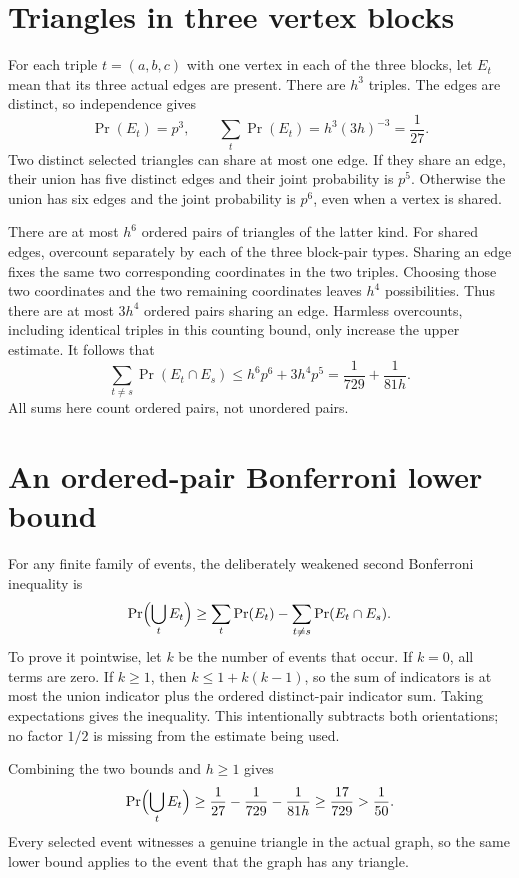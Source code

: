 \documentclass[11pt]{article}
\begin{document}
\newpage
\section*{Triangles in three vertex blocks}
For each triple $t=(a,b,c)$ with one vertex in each
of the three blocks, let $E_t$ mean that its three
actual edges are present. There are $h^3$ triples.
The edges are distinct, so independence gives
\[
               \Pr(E_t)=p^3,
           \qquad \sum_t\Pr(E_t)=h^3(3h)^{-3}=\frac1{27}.
\]
Two distinct selected triangles can share at most
one edge. If they share an edge, their union has
five distinct edges and their joint probability is
$p^5$. Otherwise the union has six edges and the
joint probability is $p^6$, even when a vertex is shared.

There are at most $h^6$ ordered pairs of triangles
of the latter kind. For shared edges, overcount
separately by each of the three block-pair types.
Sharing an edge fixes the same two corresponding
coordinates in the two triples. Choosing those two
coordinates and the two remaining coordinates
leaves $h^4$ possibilities. Thus there are at most
$3h^4$ ordered pairs sharing an edge. Harmless
overcounts, including identical triples in this
counting bound, only increase the upper estimate.
It follows that
\[
 \sum_{t\ne s}\Pr(E_t\cap E_s)
       \leq h^6p^6+3h^4p^5
       =\frac1{729}+\frac1{81h}.
\]
All sums here count ordered pairs, not unordered pairs.

\section*{An ordered-pair Bonferroni lower bound}
For any finite family of events, the deliberately
weakened second Bonferroni inequality is
\[
 \Pr\Bigl(\bigcup_t E_t\Bigr)
     \geq\sum_t\Pr(E_t)
                  -\sum_{t\ne s}\Pr(E_t\cap E_s).
\]
To prove it pointwise, let $k$ be the number of events
that occur. If $k=0$, all terms are zero. If $k\geq1$,
then $k\leq1+k(k-1)$, so the sum of indicators is at
most the union indicator plus the ordered distinct-pair
indicator sum. Taking expectations gives the inequality.
This intentionally subtracts both orientations; no
factor $1/2$ is missing from the estimate being used.

Combining the two bounds and $h\geq1$ gives
\[
 \Pr\Bigl(\bigcup_t E_t\Bigr)
   \geq\frac1{27}-\frac1{729}-\frac1{81h}
   \geq\frac{17}{729}>\frac1{50}.
\]
Every selected event witnesses a genuine triangle in
the actual graph, so the same lower bound applies
to the event that the graph has any triangle.
\end{document}
